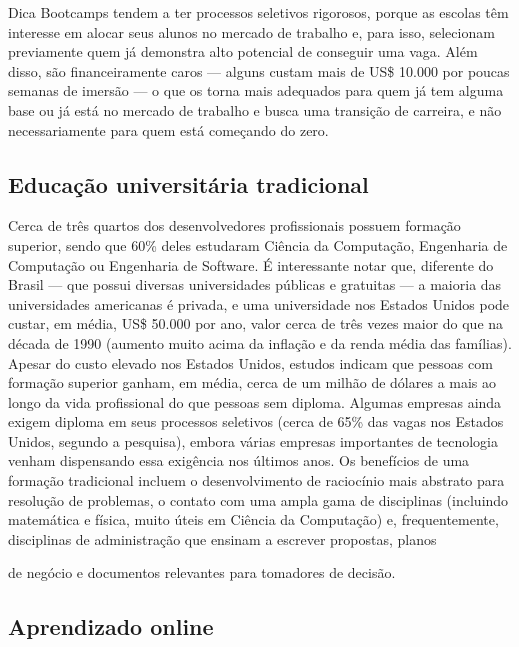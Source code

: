 \begin{infobox}{Dica}
Bootcamps tendem a ter processos seletivos rigorosos, porque as escolas têm interesse em alocar seus alunos no mercado de trabalho e, para isso, selecionam previamente quem já demonstra alto potencial de conseguir uma vaga. Além disso, são financeiramente caros — alguns custam mais de US\$ 10.000 por poucas semanas de imersão — o que os torna mais adequados para quem já tem alguma base ou já está no mercado de trabalho e busca uma transição de carreira, e não necessariamente para quem está começando do zero.
\end{infobox}

\subsection{Educação universitária tradicional}

Cerca de três quartos dos desenvolvedores profissionais possuem formação superior, sendo que 60\% deles estudaram Ciência da Computação, Engenharia de Computação ou Engenharia de Software. É interessante notar que, diferente do Brasil — que possui diversas universidades públicas e gratuitas — a maioria das universidades americanas é privada, e uma universidade nos Estados Unidos pode custar, em média, US\$ 50.000 por ano, valor cerca de três vezes maior do que na década de 1990 (aumento muito acima da inflação e da renda média das famílias). Apesar do custo elevado nos Estados Unidos, estudos indicam que pessoas com formação superior ganham, em média, cerca de um milhão de dólares a mais ao longo da vida profissional do que pessoas sem diploma. Algumas empresas ainda exigem diploma em seus processos seletivos (cerca de 65\% das vagas nos Estados Unidos, segundo a pesquisa), embora várias empresas importantes de tecnologia venham dispensando essa exigência nos últimos anos. Os benefícios de uma formação tradicional incluem o desenvolvimento de raciocínio mais abstrato para resolução de problemas, o contato com uma ampla gama de disciplinas (incluindo matemática e física, muito úteis em Ciência da Computação) e, frequentemente, disciplinas de administração que ensinam a escrever propostas, planos

de negócio e documentos relevantes para tomadores de decisão.

\subsection{Aprendizado online}

